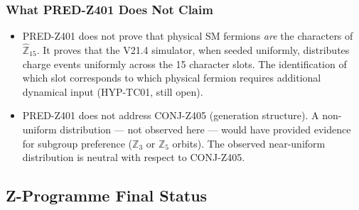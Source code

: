 \documentclass[12pt, a4paper]{article}
\begin{document}
\subsubsection{What PRED-Z401 Does Not Claim}

\begin{itemize}[leftmargin=*]
  \item PRED-Z401 does not prove that physical SM fermions \emph{are}
    the characters of $\hat{\mathbb{Z}}_{15}$. It proves that the
    V21.4 simulator, when seeded uniformly, distributes charge events
    uniformly across the 15 character slots. The identification of
    which slot corresponds to which physical fermion requires additional
    dynamical input (HYP-TC01, still open).
  \item PRED-Z401 does not address CONJ-Z405 (generation structure).
    A non-uniform distribution --- not observed here --- would have
    provided evidence for subgroup preference ($\mathbb{Z}_3$ or
    $\mathbb{Z}_5$ orbits). The observed near-uniform distribution
    is neutral with respect to CONJ-Z405.
\end{itemize}

\subsection{Z-Programme Final Status}
\label{sec:status}
\end{document}
